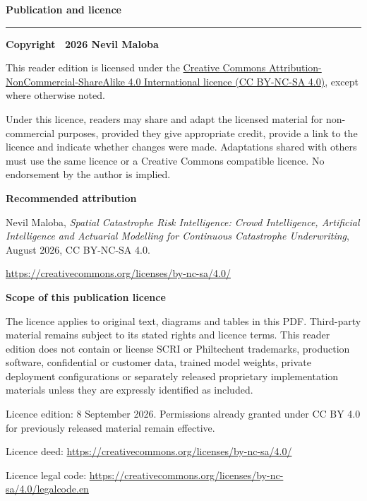 
\frontmatter

\begingroup
\RaggedRight
\thispagestyle{empty}
\vspace*{18mm}

{\sffamily\bfseries\LARGE\color{SeriesNavy}Publication and licence\par}
\vspace{4mm}
{\color{SeriesGold}\rule{44mm}{1.8pt}\par}
\vspace{14mm}

{\sffamily\bfseries\large Copyright \textcopyright\ 2026 Nevil Maloba\par}
\vspace{5mm}

This reader edition is licensed under the
\href{https://creativecommons.org/licenses/by-nc-sa/4.0/}{Creative Commons Attribution-NonCommercial-ShareAlike 4.0 International licence (CC BY-NC-SA 4.0)},
except where otherwise noted.

Under this licence, readers may share and adapt the licensed material for non-commercial purposes, provided they give appropriate credit, provide a link to the licence and indicate whether changes were made. Adaptations shared with others must use the same licence or a Creative Commons compatible licence. No endorsement by the author is implied.

\vspace{6mm}
{\sffamily\bfseries\color{SeriesBlue}Recommended attribution\par}

Nevil Maloba, \emph{Spatial Catastrophe Risk Intelligence: Crowd Intelligence, Artificial Intelligence and Actuarial Modelling for Continuous Catastrophe Underwriting}, August 2026, CC BY-NC-SA 4.0.

\smallskip
\url{https://creativecommons.org/licenses/by-nc-sa/4.0/}

\vspace{6mm}
{\sffamily\bfseries\color{SeriesBlue}Scope of this publication licence\par}

The licence applies to original text, diagrams and tables in this PDF. Third-party material remains subject to its stated rights and licence terms. This reader edition does not contain or license SCRI or Philtechent trademarks, production software, confidential or customer data, trained model weights, private deployment configurations or separately released proprietary implementation materials unless they are expressly identified as included.

\vspace{4mm}
{\small\sffamily\color{SeriesSlate}Licence edition: 8 September 2026. Permissions already granted under CC BY 4.0 for previously released material remain effective.\par}

\vfill
{\small\sffamily\color{SeriesSlate}
Licence deed: \url{https://creativecommons.org/licenses/by-nc-sa/4.0/}\par
Licence legal code: \url{https://creativecommons.org/licenses/by-nc-sa/4.0/legalcode.en}\par
}

\endgroup
\clearpage
